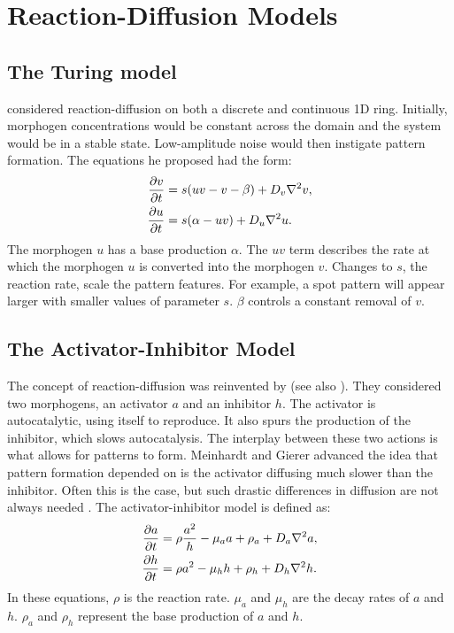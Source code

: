 \section{Reaction-Diffusion Models}
\subsection{The Turing model}
\citet{turing1952} considered reaction-diffusion on both a discrete and continuous 1D ring. Initially, morphogen concentrations would be constant across the domain and the system would be in a stable state. Low-amplitude noise would then instigate pattern formation. The equations he proposed had the form:
	\begin{equation}
	\begin{aligned} \label{eq:turingRD}
			\frac{\partial v}{\partial t} &= s(uv-v-\beta) + D_v \nabla^2 v,\\
			\frac{\partial u}{\partial t} &= s(\alpha-uv) + D_u \nabla^2 u.
	\end{aligned}
	\end{equation}
The morphogen $u$ has a base production $\alpha$. The $uv$ term describes the rate at which the morphogen $u$ is converted into the morphogen $v$. Changes to $s$, the reaction rate, scale the pattern features. For example, a spot pattern will appear larger with smaller values of parameter $s$. $\beta$ controls a constant removal of $v$.

\subsection{The Activator-Inhibitor Model}
The concept of reaction-diffusion was reinvented by \citet{gierer1972} (see also \citep{meinhardt1982}). They considered two morphogens, an activator $a$ and an inhibitor $h$. The activator is autocatalytic, using itself to reproduce. It also spurs the production of the inhibitor, which slows autocatalysis. The interplay between these two actions is what allows for patterns to form. Meinhardt and Gierer advanced the idea that pattern formation depended on is the activator diffusing much slower than the inhibitor. Often this is the case, but such drastic differences in diffusion are not always needed \citep{gray1984, marcon2016}. The activator-inhibitor model is defined as:
	\begin{equation}
	\begin{aligned} \label{eq:activatorInhibitorRD}
			\frac{\partial a}{\partial t} &= \rho \frac{a^2}{h} - \mu_a a + \rho_a + D_a \nabla^2 a,\\
			\frac{\partial h}{\partial t} &= \rho a^2 - \mu_h h  + \rho_h + D_h \nabla^2 h.
	\end{aligned}
	\end{equation}
In these equations, $\rho$ is the reaction rate. $\mu_a$ and $\mu_h$ are the decay rates of $a$ and $h$. $\rho_a$ and $\rho_h$ represent the base production of $a$ and $h$. 

